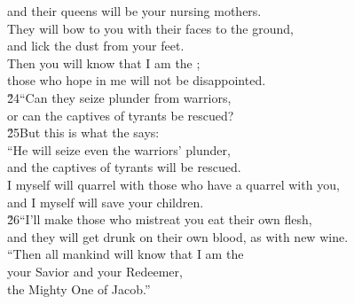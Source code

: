 \begin{poetry}
\poemll    and their queens will be your nursing mothers. \\
\poeml They will bow to you with their faces to the ground, \\
\poemll    and lick the dust from your feet. \\
\poeml Then you will know that I am the ; \\
\poemll    those who hope in me will not be disappointed. \\
\poeml \v{24}``Can they seize plunder from warriors, \\
\poemll    or can the captives of tyrants be rescued? \\
\poeml \v{25}But this is what the  says: \\
\poeml ``He will seize even the warriors' plunder, \\
\poemll    and the captives of tyrants will be rescued. \\
\poeml I myself will quarrel with those who have a quarrel with you, \\
\poemll    and I myself will save your children. \\
\poeml \v{26}``I'll make those who mistreat you eat their own flesh, \\
\poemll    and they will get drunk on their own blood, as with new wine. \\
\poeml ``Then all mankind will know that I am the  \\
\poemll    your Savior and your Redeemer, \\
\poemlll       the Mighty One of Jacob.''
\end{poetry}

